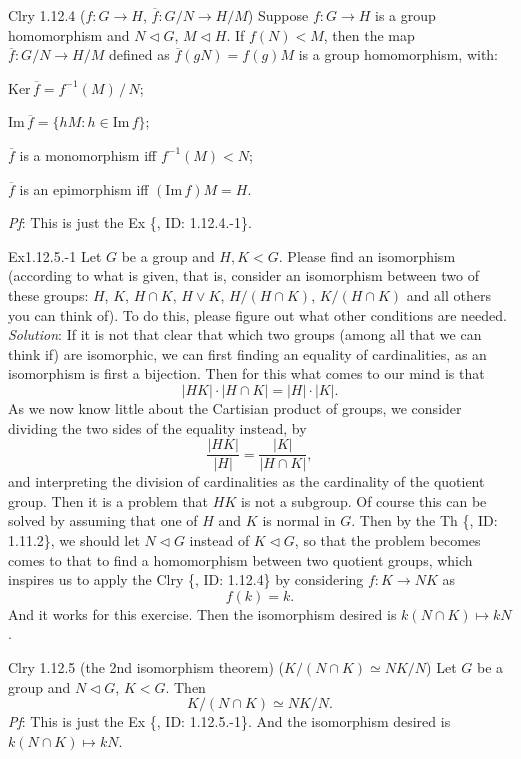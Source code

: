 \documentclass{article}
\newcommand{\nles}{\vartriangleleft}
\newcommand{\Ker}{\text{Ker}\,}
\newcommand{\Ima}{\text{Im}\,}
\begin{document}
\begin{Th}{Clry 1.12.4 ($f: G\to H$, $\overline{f}: G/N\to H/M$)}
    Suppose $f: G\to H$ is a group homomorphism and $N\nles G$, $M\nles H$. If $f(N)<M$, then the map $\overline{f}: G/N\to H/M$ defined as $\overline{f}(gN) = f(g)M$ is a group homomorphism, with:
    \begin{compactenum}
        \item $\Ker \overline{f} = f^{-1}(M)\,/\,N$;
        \item $\Ima \overline{f} = \{hM: h\in\Ima f\}$;
        \item $\overline{f}$ is a monomorphism iff $f^{-1}(M) < N$;
        \item $\overline{f}$ is an epimorphism iff $(\Ima f) M = H$.
    \end{compactenum}
    \tcblower
    \textit{Pf}: This is just the Ex \{, ID: 1.12.4.-1\}.
\end{Th}

\begin{Th}{Ex1.12.5.-1}
    Let $G$ be a group and $H, K< G$. Please find an isomorphism (according to what is given, that is, consider an isomorphism between two of these groups: $H$, $K$, $H\cap K$, $H\vee K$, $H/(H\cap K)$, $K/(H\cap K)$ and all others you can think of). To do this, please figure out what other conditions are needed.
    \tcblower
    \textit{Solution}: If it is not that clear that which two groups (among all that we can think if) are isomorphic, we can first finding an equality of cardinalities, as an isomorphism is first a bijection. Then for this what comes to our mind is that
    $$ |HK|\cdot |H\cap K|= |H|\cdot |K|. $$
    As we now know little about the Cartisian product of groups, we consider dividing the two sides of the equality instead, by
    $$ \frac{|HK|}{|H|} = \frac{|K|}{|H\cap K|}, $$
    and interpreting the division of cardinalities as the cardinality of the quotient group. Then it is a problem that $HK$ is not a subgroup. Of course this can be solved by assuming that one of $H$ and $K$ is normal in $G$. Then by the Th \{, ID: 1.11.2\}, we should let \textcolor{P}{$N\nles G$} instead of $K\nles G$, so that the problem becomes comes to that to find a homomorphism between two quotient groups, which inspires us to apply the Clry \{, ID: 1.12.4\} by considering $f: K\to NK$ as 
    $$ f(k) = k. $$
    And it works for this exercise. Then the isomorphism desired is $k(N\cap K)\mapsto kN$.
\end{Th}

\begin{Th}{Clry 1.12.5 (the 2nd isomorphism theorem) ($ K/(N\cap K) \simeq NK/N $)}
    Let $G$ be a group and $N\nles G$, $K<G$. Then
    $$ K/(N\cap K) \simeq NK/N. $$
    \tcblower
    \textit{Pf}: This is just the Ex \{, ID: 1.12.5.-1\}. And the isomorphism desired is $k(N\cap K)\mapsto kN$.
\end{Th}
\end{document}
